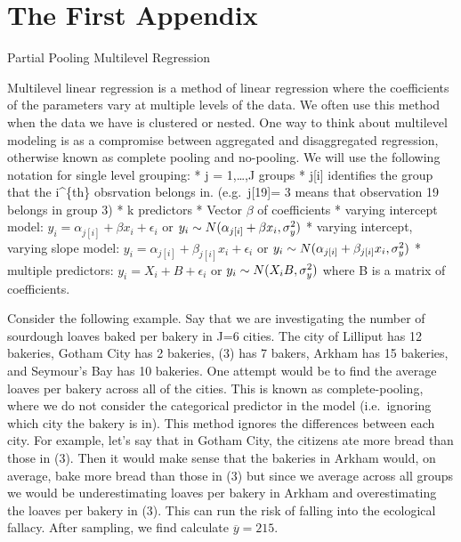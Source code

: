 \documentclass[12pt,twoside]{reedthesis}
\begin{document}
\appendix

\hypertarget{the-first-appendix}{%
\chapter{The First Appendix}\label{the-first-appendix}}

Partial Pooling Multilevel Regression

Multilevel linear regression is a method of linear regression where the coefficients of the parameters vary at multiple levels of the data. We often use this method when the data we have is clustered or nested. One way to think about multilevel modeling is as a compromise between aggregated and disaggregated regression, otherwise known as complete pooling and no-pooling. We will use the following notation for single level grouping:
* j = 1,\ldots{},J groups
* j{[}i{]} identifies the group that the i\^{}\{th\} obsrvation belongs in. (e.g.~j{[}19{]}= 3 means that observation 19 belongs in group 3)
* k predictors
* Vector \(\beta\) of coefficients
* varying intercept model: \(y_i = \alpha_{j[i]} + \beta x_i + \epsilon_i\) or \(y_i \sim N(\alpha_{j[i]} + \beta x_i, \space \sigma_y^2)\)
* varying intercept, varying slope model: \(y_i = \alpha_{j[i]} + \beta_{j[i]}x_i + \epsilon_i\) or \(y_i \sim N(\alpha_{j[i]} + \beta_{j[i]} x_i,\space \sigma_y^2)\)
* multiple predictors: \(y_i = X_i + B + \epsilon_i\) or \(y_i \sim N(X_iB, \space \sigma^2_y)\) where B is a matrix of coefficients.

Consider the following example.
Say that we are investigating the number of sourdough loaves baked per bakery in J=6 cities. The city of Lilliput has 12 bakeries, Gotham City has 2 bakeries, (3) has 7 bakers, Arkham has 15 bakeries, and Seymour's Bay has 10 bakeries. One attempt would be to find the average loaves per bakery across all of the cities. This is known as complete-pooling, where we do not consider the categorical predictor in the model (i.e.~ignoring which city the bakery is in). This method ignores the differences between each city. For example, let's say that in Gotham City, the citizens ate more bread than those in (3). Then it would make sense that the bakeries in Arkham would, on average, bake more bread than those in (3) but since we average across all groups we would be underestimating loaves per bakery in Arkham and overestimating the loaves per bakery in (3). This can run the risk of falling into the ecological fallacy. After sampling, we find calculate \(\overline{y} = 215\).
\end{document}

